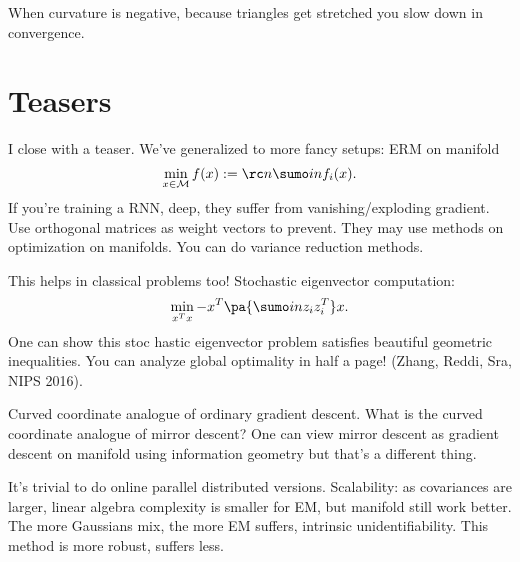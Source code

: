 When curvature is negative, because triangles get stretched you slow down in convergence. 

\section{Teasers}

I close with a teaser. We've generalized to more fancy setups: ERM on manifold
$$
\min_{x\in \cal M} f(x) := \rc n \sumo in f_i(x).
$$
If you're training a RNN, deep, they suffer from vanishing/exploding gradient. Use orthogonal matrices as weight vectors to prevent. They may use methods on optimization on manifolds. You can do variance reduction methods. 

This helps in classical problems too!
Stochastic eigenvector computation:
$$
\min_{x^Tx} -x^T\pa{\sumo in z_iz_i^T}x.
$$
One can show this stoc hastic eigenvector problem satisfies beautiful geometric inequalities. You can analyze global optimality in half a page! (Zhang, Reddi, Sra, NIPS 2016).

Curved coordinate analogue of ordinary gradient descent. What is the curved coordinate analogue of mirror descent? One can view mirror descent as gradient descent on manifold using information geometry but that's a different thing.

It's trivial to do online parallel distributed versions. Scalability: as covariances are larger, linear algebra complexity is smaller for EM, but manifold still work better. The more Gaussians mix, the more EM suffers, intrinsic unidentifiability. This method is more robust, suffers less. 



\printbibliography
